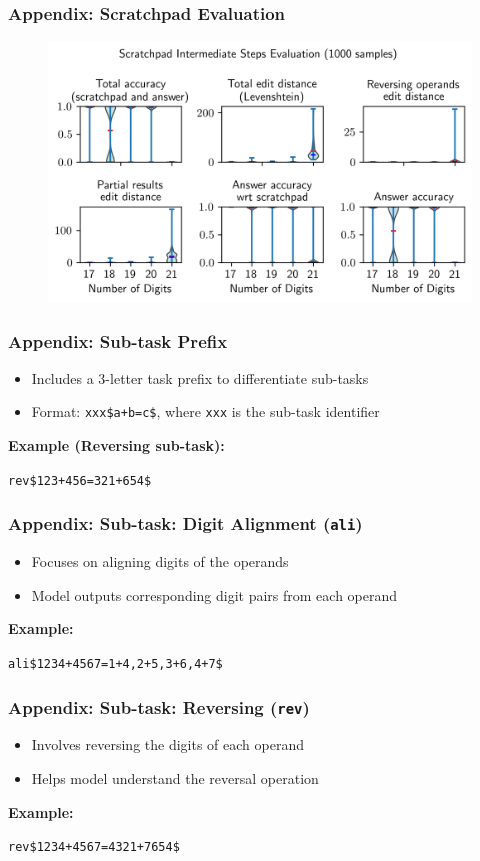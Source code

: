 \documentclass[14pt,aspectratio=169]{beamer}
\theoremstyle{remark}
\begin{document}
\begin{frame}
    \frametitle{Appendix: Scratchpad Evaluation}
    \begin{figure}
        \centering
        \includegraphics[width=0.6\linewidth]{fig/scratchpad_eval.png}
    \end{figure}
\end{frame}

\begin{frame}
    \frametitle{Appendix: Sub-task Prefix}
    \begin{itemize}
        \item Includes a 3-letter task prefix to differentiate sub-tasks
        \item Format: \texttt{xxx\$a+b=c\$}, where \texttt{xxx} is the sub-task identifier
    \end{itemize}
    \vspace{0.5em}
    \textbf{Example (Reversing sub-task):}
    \begin{center}
        \texttt{rev\$123+456=321+654\$}
    \end{center}
\end{frame}

\begin{frame}
    \frametitle{Appendix: Sub-task: Digit Alignment (\texttt{ali})}
    \begin{itemize}
        \item Focuses on aligning digits of the operands
        \item Model outputs corresponding digit pairs from each operand
    \end{itemize}
    \vspace{0.5em}
    \textbf{Example:}
    \begin{center}
        \texttt{ali\$1234+4567=1+4,2+5,3+6,4+7\$}
    \end{center}
\end{frame}

\begin{frame}
    \frametitle{Appendix: Sub-task: Reversing (\texttt{rev})}
    \begin{itemize}
        \item Involves reversing the digits of each operand
        \item Helps model understand the reversal operation
    \end{itemize}
    \vspace{0.5em}
    \textbf{Example:}
    \begin{center}
        \texttt{rev\$1234+4567=4321+7654\$}
    \end{center}
\end{frame}
\end{document}

